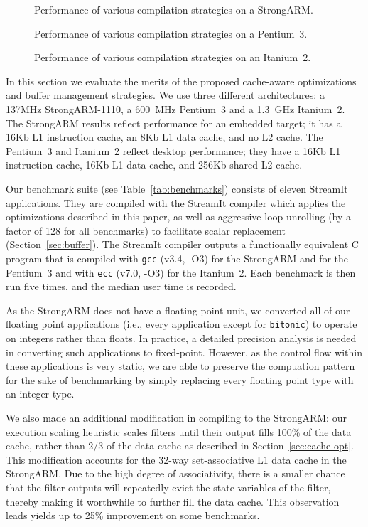 \begin{figure}
\begin{minipage}{3.35in}
\caption{Performance of various compilation strategies on a StrongARM.\protect\label{fig:arm-perf2}}

\caption{Performance of various compilation strategies on a Pentium~3.\protect\label{fig:p3-perf2}}

\caption{Performance of various compilation strategies on an Itanium~2.\protect\label{fig:i2-perf2}}
\end{minipage}
\end{figure}

In this section we evaluate the merits of the proposed cache-aware
optimizations and buffer management strategies.  We use three
different architectures: a 137MHz StrongARM-1110, a 600~MHz Pentium~3
and a 1.3~GHz Itanium~2. The StrongARM results reflect performance for
an embedded target; it has a 16Kb L1 instruction cache, an 8Kb L1 data
cache, and no L2 cache.  The Pentium~3 and Itanium~2 reflect desktop
performance; they have a 16Kb L1 instruction cache, 16Kb L1 data
cache, and 256Kb shared L2 cache.

Our benchmark suite (see Table~\ref{tab:benchmarks}) consists of
eleven StreamIt applications. They are compiled with the StreamIt
compiler which applies the optimizations described in this paper, as
well as aggressive loop unrolling (by a factor of 128 for all
benchmarks) to facilitate scalar replacement
(Section~\ref{sec:buffer}).  The StreamIt compiler outputs a
functionally equivalent C program that is compiled with \texttt{gcc}
(v3.4, -O3) for the StrongARM and for the Pentium~3 and with
\texttt{ecc} (v7.0, -O3) for the Itanium~2.  Each benchmark is then
run five times, and the median user time is recorded.

As the StrongARM does not have a floating point unit, we converted all
of our floating point applications (i.e., every application except for
{\tt bitonic}) to operate on integers rather than floats.  In
practice, a detailed precision analysis is needed in converting such
applications to fixed-point.  However, as the control flow within
these applications is very static, we are able to preserve the
compuation pattern for the sake of benchmarking by simply replacing
every floating point type with an integer type.

We also made an additional modification in compiling to the StrongARM:
our execution scaling heuristic scales filters until their output
fills 100\% of the data cache, rather than 2/3 of the data cache as
described in Section~\ref{sec:cache-opt}.  This modification accounts
for the 32-way set-associative L1 data cache in the StrongARM.  Due to
the high degree of associativity, there is a smaller chance that the
filter outputs will repeatedly evict the state variables of the
filter, thereby making it worthwhile to further fill the data cache.
This observation leads yields up to 25\% improvement on some
benchmarks.


